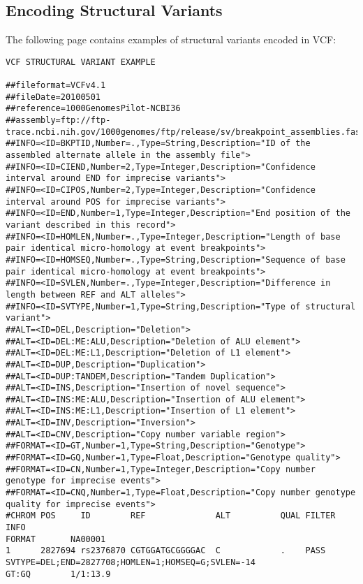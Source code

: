 \documentclass[8pt]{article}
\begin{document}
\subsection{Encoding Structural Variants}
The following page contains examples of structural variants encoded in VCF:
\pagebreak
\footnotesize
\begin{landscape}
\begin{verbatim}
VCF STRUCTURAL VARIANT EXAMPLE

##fileformat=VCFv4.1
##fileDate=20100501
##reference=1000GenomesPilot-NCBI36
##assembly=ftp://ftp-trace.ncbi.nih.gov/1000genomes/ftp/release/sv/breakpoint_assemblies.fasta
##INFO=<ID=BKPTID,Number=.,Type=String,Description="ID of the assembled alternate allele in the assembly file">
##INFO=<ID=CIEND,Number=2,Type=Integer,Description="Confidence interval around END for imprecise variants">
##INFO=<ID=CIPOS,Number=2,Type=Integer,Description="Confidence interval around POS for imprecise variants">
##INFO=<ID=END,Number=1,Type=Integer,Description="End position of the variant described in this record">
##INFO=<ID=HOMLEN,Number=.,Type=Integer,Description="Length of base pair identical micro-homology at event breakpoints">
##INFO=<ID=HOMSEQ,Number=.,Type=String,Description="Sequence of base pair identical micro-homology at event breakpoints">
##INFO=<ID=SVLEN,Number=.,Type=Integer,Description="Difference in length between REF and ALT alleles">
##INFO=<ID=SVTYPE,Number=1,Type=String,Description="Type of structural variant">
##ALT=<ID=DEL,Description="Deletion">
##ALT=<ID=DEL:ME:ALU,Description="Deletion of ALU element">
##ALT=<ID=DEL:ME:L1,Description="Deletion of L1 element">
##ALT=<ID=DUP,Description="Duplication">
##ALT=<ID=DUP:TANDEM,Description="Tandem Duplication">
##ALT=<ID=INS,Description="Insertion of novel sequence">
##ALT=<ID=INS:ME:ALU,Description="Insertion of ALU element">
##ALT=<ID=INS:ME:L1,Description="Insertion of L1 element">
##ALT=<ID=INV,Description="Inversion">
##ALT=<ID=CNV,Description="Copy number variable region">
##FORMAT=<ID=GT,Number=1,Type=String,Description="Genotype">
##FORMAT=<ID=GQ,Number=1,Type=Float,Description="Genotype quality">
##FORMAT=<ID=CN,Number=1,Type=Integer,Description="Copy number genotype for imprecise events">
##FORMAT=<ID=CNQ,Number=1,Type=Float,Description="Copy number genotype quality for imprecise events">
#CHROM POS     ID        REF              ALT          QUAL FILTER INFO                                                               FORMAT       NA00001
1      2827694 rs2376870 CGTGGATGCGGGGAC  C            .    PASS   SVTYPE=DEL;END=2827708;HOMLEN=1;HOMSEQ=G;SVLEN=-14                 GT:GQ        1/1:13.9

\end{verbatim}
\end{landscape}
\end{document}
